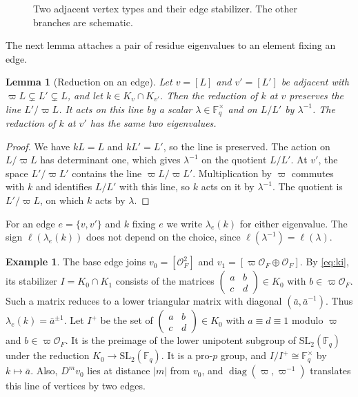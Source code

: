 \documentclass[12pt,letterpaper]{article}
\numberwithin{equation}{section}
\newtheorem{lemma}[theorem]{Lemma}
\theoremstyle{definition}
\newtheorem{example}[theorem]{Example}
\theoremstyle{remark}
\newcommand{\OO}{\mathcal O_F}
\newcommand{\kk}{\mathbb F_q}
\newcommand{\diag}{\operatorname{diag}}
\newcommand{\sm}[4]{\left(\begin{smallmatrix}#1&#2\\#3&#4\end{smallmatrix}\right)}
\begin{document}
\begin{figure}[ht]
\centering
{}
\caption{Two adjacent vertex types and their edge stabilizer. The other branches are schematic.}
\label{fig:edge}
\end{figure}

The next lemma attaches a pair of residue eigenvalues to an element fixing an edge.

\begin{lemma}[Reduction on an edge]\label{lem:edgered}
Let $v=[L]$ and $v'=[L']$ be adjacent with $\varpi L\subsetneq L'\subsetneq L$, and let $k\in K_v\cap K_{v'}$. Then the reduction of $k$ at $v$ preserves the line $L'/\varpi L$. It acts on this line by a scalar $\lambda\in\kk^\times$ and on $L/L'$ by $\lambda^{-1}$. The reduction of $k$ at $v'$ has the same two eigenvalues.
\end{lemma}
\begin{proof}
We have $kL=L$ and $kL'=L'$, so the line is preserved. The action on $L/\varpi L$ has determinant one, which gives $\lambda^{-1}$ on the quotient $L/L'$. At $v'$, the space $L'/\varpi L'$ contains the line $\varpi L/\varpi L'$. Multiplication by $\varpi$ commutes with $k$ and identifies $L/L'$ with this line, so $k$ acts on it by $\lambda^{-1}$. The quotient is $L'/\varpi L$, on which $k$ acts by $\lambda$.
\end{proof}

For an edge $e=\{v,v'\}$ and $k$ fixing $e$ we write $\lambda_e(k)$ for either eigenvalue. The sign $\ell(\lambda_e(k))$ does not depend on the choice, since $\ell(\lambda^{-1})=\ell(\lambda)$.

\begin{example}\label{ex:baseedge}
The base edge joins $v_0=[\OO^2]$ and $v_1=[\varpi\OO\oplus\OO]$. By \eqref{eq:ki}, its stabilizer $I=K_0\cap K_1$ consists of the matrices $\sm abcd\in K_0$ with $b\in\varpi\OO$. Such a matrix reduces to a lower triangular matrix with diagonal $(\bar a,\bar a^{-1})$. Thus $\lambda_e(k)=\bar a^{\pm1}$. Let $I^+$ be the set of $\sm abcd\in K_0$ with $a\equiv d\equiv1$ modulo $\varpi$ and $b\in\varpi\OO$. It is the preimage of the lower unipotent subgroup of $\mathrm{SL}_2(\kk)$ under the reduction $K_0\to\mathrm{SL}_2(\kk)$. It is a pro-$p$ group, and $I/I^+\cong\kk^\times$ by $k\mapsto\bar a$. Also, $D^mv_0$ lies at distance $|m|$ from $v_0$, and $\diag(\varpi,\varpi^{-1})$ translates this line of vertices by two edges.
\end{example}
\end{document}
